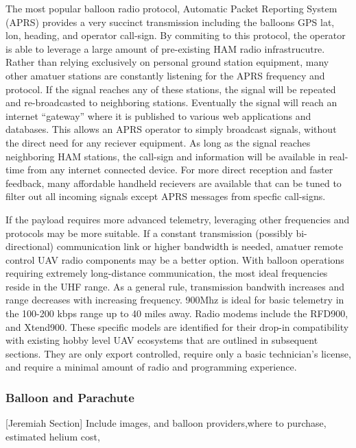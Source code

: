 \documentclass[heading.tex]{subfiles}
\begin{document}
The most popular balloon radio protocol, Automatic Packet Reporting System (APRS)
provides a very succinct transmission including the balloons GPS lat, lon, heading,
and operator call-sign. By commiting to this protocol, the operator is able to
leverage a large amount of pre-existing HAM radio infrastrucutre. Rather than
relying exclusively on personal ground station equipment, many other amatuer
stations are constantly listening for the APRS frequency and protocol. If the
signal reaches any of these stations, the signal will be repeated and re-broadcasted
to neighboring stations. Eventually the signal will reach an internet ``gateway''
where it is published to various web applications and databases.
This allows an APRS operator to simply broadcast signals,
without the direct need for any reciever equipment.
As long as the signal reaches neighboring HAM stations, the call-sign and information
will be available in real-time from any internet connected device.
For more direct reception and faster feedback,
many affordable handheld recievers are available that can
be tuned to filter out all incoming signals except APRS messages from specfic
call-signs.

If the payload requires more advanced telemetry, leveraging other frequencies
and protocols may be more suitable. If a constant transmission
(possibly bi-directional) communication link or higher bandwidth is needed,
amatuer remote control UAV radio components may be a better option.
With balloon operations requiring extremely long-distance communication,
the most ideal frequencies reside in the UHF range.
As a general rule, transmission bandwith increases and range decreases with
increasing frequency. 900Mhz is ideal for
basic telemetry in the 100-200 kbps range up to 40 miles away. Radio modems
include the RFD900, and Xtend900. These specific models are identified for their
drop-in compatibility with existing hobby level UAV ecosystems that are outlined
in subsequent sections. They are only export controlled, require only
a basic technician's license, and require a minimal amount of radio and 
programming experience.

\subsubsection{Balloon and Parachute}

[Jeremiah Section]
Include images, and balloon providers,where to purchase, estimated helium cost,
\end{document}
